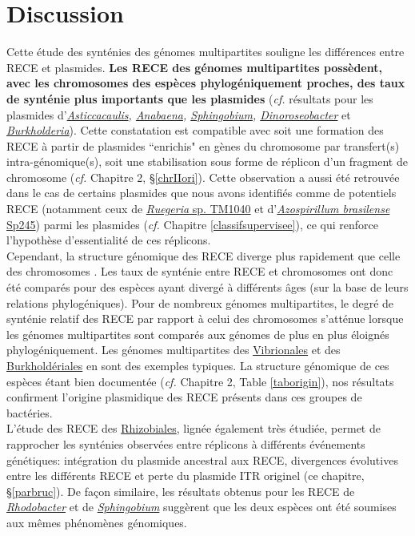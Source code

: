 \section{Discussion}
	Cette étude des synténies des génomes multipartites souligne les différences entre RECE et plasmides. \textbf{\color{orange} Les RECE des génomes multipartites possèdent, avec les chromosomes des espèces phylogéniquement proches, des taux de synténie plus importants que les plasmides} (\textit{cf.} résultats pour les plasmides d'\textit{\hyperref[parasti]{Asticcacaulis}, \hyperref[paranab]{Anabaena}, \hyperref[parsphi]{Sphingobium}, \hyperref[parpara]{Dinoroseobacter}} et \textit{\hyperref[paraburk]{Burkholderia}}). Cette constatation est compatible avec soit une formation des RECE à partir de plasmides ``enrichis" en gènes du chromosome par transfert(s) intra-génomique(s), soit une stabilisation sous forme de réplicon d'un fragment de chromosome (\textit{cf.} Chapitre 2, \S \ref{chrIIori}). Cette observation a aussi été retrouvée dans le cas de certains plasmides que nous avons identifiés comme de potentiels RECE (notamment ceux de \hyperref[pararueg]{\textit{Ruegeria} sp. TM1040} et d'\hyperref[parazos]{\textit{Azospirillum brasilense} Sp245}) parmi les plasmides (\textit{cf.} Chapitre \ref{classifsupervisee}), ce qui renforce l'hypothèse d'essentialité de ces réplicons. \\
	Cependant, la structure génomique des RECE diverge plus rapidement que celle des chromosomes \citep{Bavishi2010}. Les taux de synténie entre RECE et chromosomes ont donc été comparés pour des espèces ayant divergé à différents âges (sur la base de leurs relations phylogéniques). Pour de nombreux génomes multipartites, le degré de synténie relatif des RECE par rapport à celui des chromosomes s'atténue lorsque les génomes multipartites sont comparés aux génomes de plus en plus éloignés phylogéniquement. Les génomes multipartites des \hyperref[parvibr]{Vibrionales} et des \hyperref[parburk]{Burkholdériales} en sont des exemples typiques. La structure génomique de ces espèces étant bien documentée (\textit{cf.} Chapitre 2, Table \ref{taborigin}), nos résultats confirment l'origine plasmidique des RECE présents dans ces groupes de bactéries. \\
	L'étude des RECE des \hyperref[parbruce]{Rhizobiales}, lignée également très étudiée, permet de rapprocher les synténies observées entre réplicons à différents événements génétiques: intégration du plasmide ancestral aux RECE, divergences évolutives entre les différents RECE et perte du plasmide ITR originel (ce chapitre, \S \ref{parbruc}). De façon similaire, les résultats obtenus pour les RECE de \textit{\hyperref[parrhod]{Rhodobacter}} et de \textit{\hyperref[parsphi]{Sphingobium}} suggèrent que les deux espèces ont été soumises aux mêmes phénomènes génomiques.\\ 
